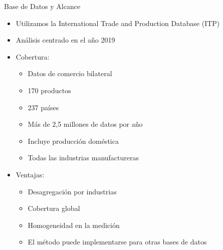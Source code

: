 \documentclass{beamer}
\begin{document}
\begin{frame}{Base de Datos y Alcance}
    \begin{itemize}
        \item Utilizamos la International Trade and Production Database (ITP)
        \item Análisis centrado en el año 2019
        \item Cobertura:
            \begin{itemize}
                \item Datos de comercio bilateral
                \item 170 productos
                \item 237 países
                \item Más de 2,5 millones de datos por año
                \item Incluye producción doméstica
                \item Todas las industrias manufactureras 
            \end{itemize}
        \item Ventajas:
            \begin{itemize}
                \item Desagregación por industrias
                \item Cobertura global
                \item Homogeneidad en la medición
                \item El método puede implementarse para otras bases de datos
            \end{itemize}
    \end{itemize}
\end{frame}
\end{document}
